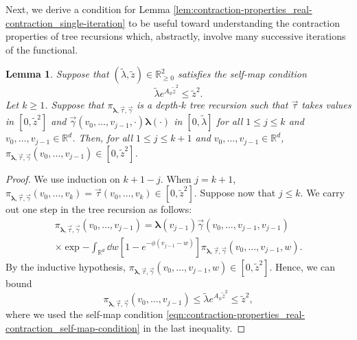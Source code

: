 \documentclass[11pt]{article}
\newcommand{\R}{\mathbb R}
\newcommand{\bl}{\bm{\lambda}}
\newcommand{\tl}{\tilde{\lambda}}
\newcommand{\tz}{\tilde{z}}
\newcommand{\aconst}{A_{\phi}}
\numberwithin{equation}{section}
\theoremstyle{plain}
\newtheorem{lemma}[theorem]{Lemma}
\theoremstyle{definition}
\theoremstyle{remark}
\begin{document}
Next, we derive a condition for Lemma \ref{lem:contraction-properties_real-contraction_single-iteration} to be useful toward understanding the contraction properties of tree recursions which, abstractly, involve many successive iterations of the functional.

\begin{lemma}
\label{lem:contraction-properties_real-contraction_self-map-preservation}
Suppose that $(\tilde{\lambda},\tilde{z})\in\R_{\ge 0}^{2}$ satisfies the \emph{self-map condition}
\begin{equation}
\label{eqn:contraction-properties_real-contraction_self-map-condition}
\tilde{\lambda}e^{\aconst\tilde{z}^{2}}\le\tilde{z}^{2}.
\end{equation}
Let $k\ge 1$.
Suppose that $\pi_{\bl,\vec{\tau},\vec{\gamma}}$ is a depth-$k$ tree recursion such that $\vec{\tau}$ takes values in $[0,\tz^{2}]$ and $\vec{\gamma}(v_{0},\dots,v_{j-1},\cdot)\bl(\cdot)$ in $[0,\tl]$ for all $1\le j\le k$ and $v_{0},\dots,v_{j-1}\in\R^{d}$.
Then, for all $1\le j\le k+1$ and $v_{0},\dots,v_{j-1}\in\R^{d}$, $\pi_{\bl,\vec{\tau},\vec{\gamma}}(v_{0},\dots,v_{j-1})\in[0,\tz^{2}]$.
\end{lemma}

\begin{proof}
We use induction on $k+1-j$.
When $j=k+1$, $\pi_{\bl,\vec{\tau},\vec{\gamma}}(v_{0},\dots,v_{k})=\vec{\tau}(v_{0},\dots,v_{k})\in[0,\tz^{2}]$.
Suppose now that $j\le k$.
We carry out one step in the tree recursion as follows:
\begin{equation}
\label{lem:contraction-properties_real-contraction_self-map-preservation_one-step}
\begin{multlined}
\pi_{\bl,\vec{\tau},\vec{\gamma}}(v_{0},\dots,v_{j-1})=
\bl(v_{j-1})\vec{\gamma}(v_{0},\dots,v_{j-1},v_{j-1})
\\
\times\exp{-\int_{\R^{d}}\dd{w}\left[1-e^{-\phi(v_{j-1}-w)}\right]\pi_{\bl,\vec{\tau},\vec{\gamma}}(v_{0},\dots,v_{j-1},w)}.
\end{multlined}
\end{equation}
By the inductive hypothesis, $\pi_{\bl,\vec{\tau},\vec{\gamma}}(v_{0},\dots,v_{j-1},w)\in[0,\tz^{2}]$.
Hence, we can bound 
\begin{equation}
\pi_{\bl,\vec{\tau},\vec{\gamma}}(v_{0},\dots,v_{j-1})\le\tl e^{\aconst\tz^{2}}\le\tz^{2},
\end{equation}
where we used the self-map condition \eqref{eqn:contraction-properties_real-contraction_self-map-condition} in the last inequality.
\end{proof}
\end{document}
